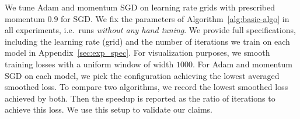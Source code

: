 We tune Adam and  momentum SGD on learning rate grids with prescribed momentum $0.9$ for SGD. We fix the parameters of Algorithm~\ref{alg:basic-algo} in all experiments, i.e.\ \tuner runs {\em without any hand tuning}.
We provide full specifications, including the learning rate (grid) and the number of iterations we train on each model in Appendix~\ref{sec:exp_spec}.
For visualization purposes, we smooth training losses with a uniform window of width $1000$. 
For Adam and momentum SGD on each model, we pick the configuration achieving the lowest averaged smoothed loss.
To compare two algorithms, we record the lowest smoothed loss achieved by both. Then the speedup is reported as the ratio of iterations to achieve this loss.
We use this setup to validate our claims.
%


